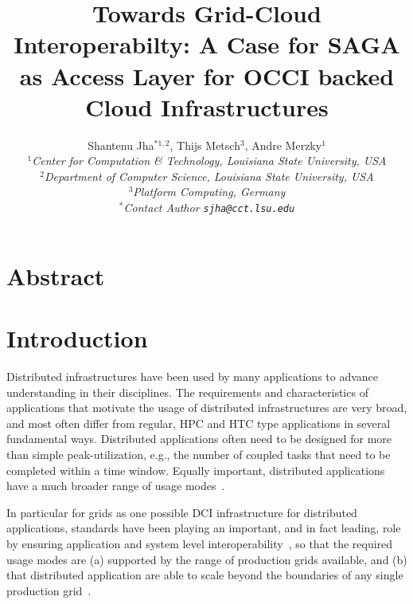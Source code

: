 \documentclass[10pt,conference,final,letterpaper,twoside,twocolumn,]{IEEEtran}
\begin{document}
\title{Towards Grid-Cloud Interoperabilty: A Case for SAGA as Access
  Layer for OCCI backed Cloud Infrastructures}

\author{Shantenu Jha$^{*1,2}$, Thijs Metsch$^{3}$, Andre Merzky$^{1}$\\
  \small{\emph{$^{1}$Center for Computation \& Technology, Louisiana State University, USA}}\\
  \small{\emph{$^{2}$Department of Computer Science, Louisiana State University, USA}}\\
  \small{\emph{$^{3}$Platform Computing, Germany}}\\
  \small{\emph{$^{*}$Contact Author \texttt{sjha@cct.lsu.edu}}}
  }

\maketitle

\section*{Abstract}

\section{Introduction}
\label{sec:intro}
 



 Distributed infrastructures have been used by many applications to
 advance understanding in their disciplines.  The requirements and
 characteristics of applications that motivate the usage of
 distributed infrastructures are very broad, and most often differ
 from regular, HPC and HTC type applications in several fundamental
 ways.  Distributed applications often need to be designed for more
 than simple peak-utilization, e.g., the number of coupled tasks that
 need to be completed within a time window.  Equally important,
 distributed applications have a much broader range of usage
 modes~\cite{dpa-paper}.

 In particular for grids as one possible DCI infrastructure for
 distributed applications, standards have been playing an important,
 and in fact leading, role by ensuring application and system level
 interoperability~\cite{gin,saga-gin}, so that the required usage
 modes are (a) supported by the range of production grids available,
 and (b) that distributed application are able to scale beyond the
 boundaries of any single production grid~\cite{grid_scale_out}.
\end{document}
